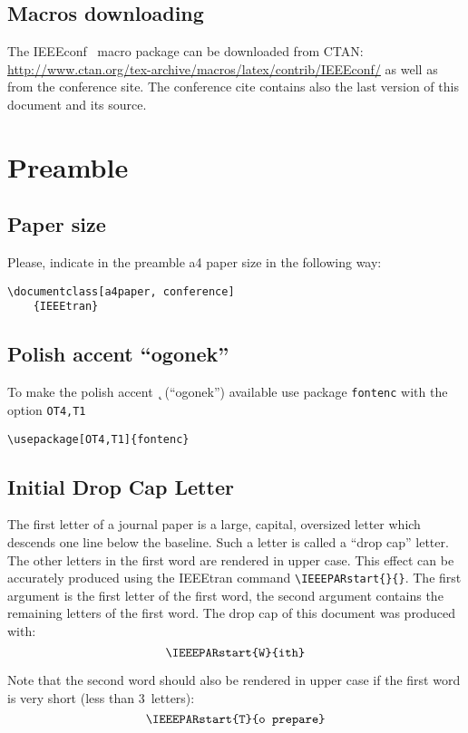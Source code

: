\documentclass[conference]{IEEEtran}
\theoremstyle{definition}
\begin{document}
		\subsection{Macros downloading}
%
The IEEEconf \LaTeXe\ macro package can be downloaded from CTAN: \url{http://www.ctan.org/tex-archive/macros/latex/contrib/IEEEconf/}
as well as from the conference site.
The conference cite contains also the last version of this document and its source.
\section{Preamble}

\subsection{Paper size}
Please, indicate in the preamble a4 paper size in the following way:
\begin{verbatim}
\documentclass[a4paper, conference]
    {IEEEtran}
\end{verbatim}

\subsection{Polish accent ``ogonek''}
To make the polish accent {\k \ } (``ogonek'') available use package \verb|fontenc| with the option \verb|OT4,T1|
\begin{verbatim}
\usepackage[OT4,T1]{fontenc}
\end{verbatim}

\subsection{Initial Drop Cap Letter}
 The first letter of a journal paper is a large, capital, oversized
letter which descends one line below the baseline. Such a
letter is called a ``drop cap'' letter. The other letters in the first
word are rendered in upper case. This effect can be accurately
produced using the IEEEtran command \verb|\IEEEPARstart{}{}|. The first argument is the first letter of the first word, the
second argument contains the remaining letters of the first
word. The drop cap of this document was produced with:
$$\verb|\IEEEPARstart{W}{ith}|$$

Note that the second word should also be rendered  in
upper case if the first word is very short (less than 3~letters):
$$\verb|\IEEEPARstart{T}{o prepare}|$$
\end{document}
